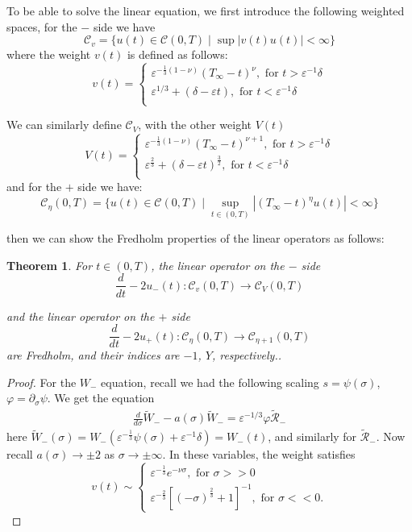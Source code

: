 \documentclass[letterpaper,11pt]{article}
\newcommand{\eps}{\varepsilon}
\numberwithin{equation}{section}
\theoremstyle{plain}
\newtheorem{theorem}{Theorem}[section]
\begin{document}
\begin{enumerate}
\begin{itemize}
To be able to solve the linear equation, we first introduce the following weighted spaces, for the $-$ side we have
\[
\mathcal{C}_v = \{u(t) \in \mathcal{C}(0,T) \mid \sup |v(t) u(t)| < \infty\}
\]
where the weight $v(t)$ is defined as follows:
\[
v(t)=
\begin{cases}
\eps^{-\frac{1}{3}(1-\nu)} (T_\infty-t)^\nu, \text{ for }t> \eps^{-1}\delta\\
\eps^{1/3}+(\delta-\eps t), \text{ for }t < \eps^{-1}\delta\\
\end{cases}
\]

We can similarly define $\mathcal{C}_V$, with the other weight $V(t)$ 
\[
V(t)=
\begin{cases}
\eps^{-\frac{1}{3}(1-\nu)} (T_\infty-t)^{\nu+1}, \text{ for }t> \eps^{-1}\delta\\
\eps^{\frac{2}{3}}+(\delta - \eps t)^{\frac{3}{2}}, \text{ for }t < \eps^{-1}\delta\\
\end{cases}
\]
and for the $+$ side we have:
\[
\mathcal{C}_\eta(0,T) = \{ u(t) \in \mathcal{C}(0,T) \mid \sup_{t\in (0,T)}|(T_\infty - t)^{\eta} u(t)| < \infty  \}
\]



then we can show the Fredholm properties of the linear operators as follows: 
\begin{theorem}
For $t \in (0,T)$, the linear operator on the $-$ side
\[
\frac{d}{dt} - 2u_-(t) : \mathcal{C}_v (0,T) \to \mathcal{C}_V (0,T)
\]

and the linear operator on the $+$ side
\[
\frac{d}{dt}  - 2u_+(t) : \mathcal{C}_\eta (0,T) \to \mathcal{C}_{\eta+1}(0,T)
\]
are Fredholm, and their indices are $-1$, $Y$, respectively..
\end{theorem}

\begin{proof}
For the $W_-$ equation, recall we had the following scaling $s=\psi(\sigma)$, $\varphi = \partial_\sigma \psi$. We get the equation
\begin{align*}
\frac{d}{d\sigma} \tilde{W}_- -a(\sigma)\tilde{W}_- = \eps^{-1/3}\varphi \tilde{\mathcal{R}}_-
\end{align*}
here $\tilde{W}_-(\sigma) = W_-(\eps^{-\frac{1}{3}} \psi(\sigma)+\eps^{-1}\delta)=W_-(t)$, and similarly for $\tilde{\mathcal{R}}_-$. Now recall $a(\sigma) \to \pm 2 $ as $\sigma \to \pm \infty$. In these variables, the weight satisfies
\[
v(t) \sim \begin{cases}
 \eps^{-\frac{1}{3}} e^{-\nu \sigma},  \text{ for }\sigma >>0 \\
\eps^{-\frac{2}{3}}[(-\sigma)^{\frac{2}{3}}+1]^{-1}, \text{ for }\sigma << 0.
\end{cases}
\]


\end{proof}
\end{itemize}
\end{enumerate}
\end{document}
